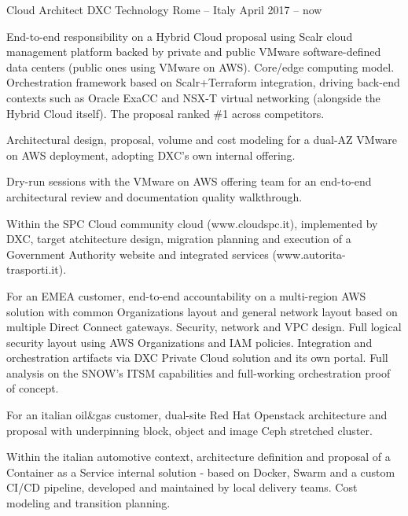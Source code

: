 
\begin{cventries}

  \cventry
    {Cloud Architect} %
    {DXC Technology} %
    {Rome -- Italy} %
    {April 2017 -- now} %
    {
      \begin{cvitems} %
        \item {End-to-end responsibility on a Hybrid Cloud proposal using Scalr cloud management platform backed by private and public VMware software-defined data centers (public ones using VMware on AWS). Core/edge computing model. Orchestration framework based on Scalr+Terraform integration, driving back-end contexts such as Oracle ExaCC and NSX-T virtual networking (alongside the Hybrid Cloud itself). The proposal ranked \#1 across competitors.}
        \item {Architectural design, proposal, volume and cost modeling for a dual-AZ VMware on AWS deployment, adopting DXC's own internal offering.}
        \item {Dry-run sessions with the VMware on AWS offering team for an end-to-end architectural review and documentation quality walkthrough.}
        \item {Within the SPC Cloud community cloud (www.cloudspc.it), implemented by DXC, target atchitecture design, migration planning and execution of a Government Authority website and integrated services (www.autorita-trasporti.it).}
        \item {For an EMEA customer, end-to-end accountability on a multi-region AWS solution with common Organizations layout and general network layout based on multiple Direct Connect gateways. Security, network and VPC design. Full logical security layout using AWS Organizations and IAM policies. Integration and orchestration artifacts via DXC Private Cloud solution and its own portal. Full analysis on the SNOW's ITSM capabilities and full-working orchestration proof of concept.}
        \item {For an italian oil\&gas customer, dual-site Red Hat Openstack architecture and proposal with underpinning block, object and image Ceph stretched cluster.}
        \item {Within the italian automotive context, architecture definition and proposal of a Container as a Service internal solution - based on Docker, Swarm and a custom CI/CD pipeline, developed and maintained by local delivery teams. Cost modeling and transition planning.}
      \end{cvitems}
    }


\end{cventries}
